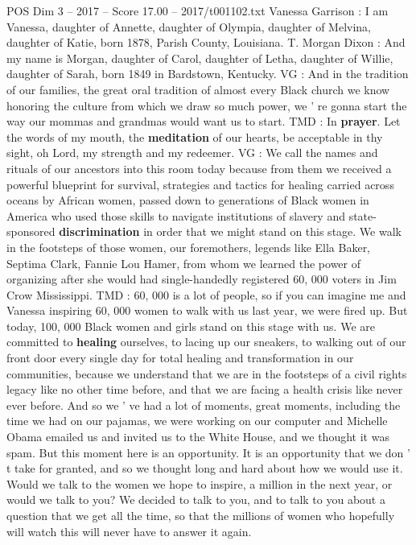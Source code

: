 \begin{textsample}{POS Dim 3 – 2017 – Score 17.00 – 2017/t001102.txt}  \label{ex:f3_pos_013}
Vanessa Garrison : I am Vanessa, daughter of Annette, daughter of Olympia, daughter of Melvina, daughter of Katie, born 1878, Parish County, Louisiana.
T.
Morgan Dixon : And my name is Morgan, daughter of Carol, daughter of Letha, daughter of Willie, daughter of Sarah, born 1849 in Bardstown, Kentucky.
VG : And in the tradition of our families, the great oral tradition of almost every Black church we know honoring the culture from which we draw so much power, we ' re gonna start the way our mommas and grandmas would want us to start.
TMD : In \textbf{prayer}.
Let the words of my mouth, the \textbf{meditation} of our hearts, be acceptable in thy sight, oh Lord, my strength and my redeemer.
VG : We call the names and rituals of our ancestors into this room today because from them we received a powerful blueprint for survival, strategies and tactics for healing carried across oceans by African women, passed down to generations of Black women in America who used those skills to navigate institutions of slavery and state-sponsored \textbf{discrimination} in order that we might stand on this stage.
We walk in the footsteps of those women, our foremothers, legends like Ella Baker, Septima Clark, Fannie Lou Hamer, from whom we learned the power of organizing after she would had single-handedly registered 60, 000 voters in Jim Crow Mississippi.
TMD : 60, 000 is a lot of people, so if you can imagine me and Vanessa inspiring 60, 000 women to walk with us last year, we were fired up.
But today, 100, 000 Black women and girls stand on this stage with us.
We are committed to \textbf{healing} ourselves, to lacing up our sneakers, to walking out of our front door every single day for total healing and transformation in our communities, because we understand that we are in the footsteps of a civil rights legacy like no other time before, and that we are facing a health crisis like never ever before.
And so we ' ve had a lot of moments, great moments, including the time we had on our pajamas, we were working on our computer and Michelle Obama emailed us and invited us to the White House, and we thought it was spam.
But this moment here is an opportunity.
It is an opportunity that we don ' t take for granted, and so we thought long and hard about how we would use it.
Would we talk to the women we hope to inspire, a million in the next year, or would we talk to you?
We decided to talk to you, and to talk to you about a question that we get all the time, so that the millions of women who hopefully will watch this will never have to answer it again.

\end{textsample}
